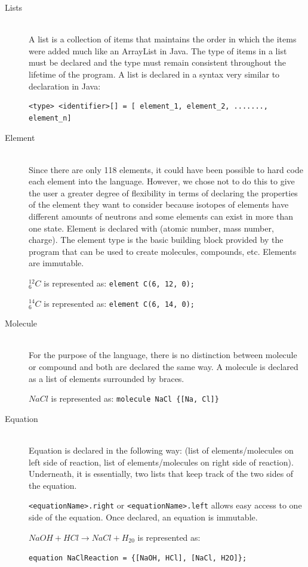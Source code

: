 \documentclass[11pt]{report}
\begin{document}
\begin{description}
\item[Lists] \hfill \\
A list is a collection of items that maintains the order in which the items were added much like an ArrayList in Java. The type of items in a list must be declared and the type must remain consistent throughout the lifetime of the program. A list is declared in a syntax very similar to declaration in Java:
\begin{verbatim}<type> <identifier>[] = [ element_1, element_2, ......., element_n]\end{verbatim}

\item[Element] \hfill \\
Since there are only 118 elements, it could have been possible to hard code each element into the language. However, we chose not to do this to give the user a greater degree of flexibility in terms of declaring the properties of the element they want to consider because isotopes of elements have different amounts of neutrons and some elements can exist in more than one state. Element is declared with (atomic number, mass number, charge). The element type is the basic building block provided by the program that can be used to create molecules, compounds, etc. Elements are immutable.

$_6^{12}C$ is represented as: \texttt{element C(6, 12, 0);}

$_6^{14}C$ is represented as: \texttt{element C(6, 14, 0);}

\item[Molecule] \hfill \\ For the purpose of the language, there is no distinction between molecule or compound and both are declared the same way. A molecule is declared as a list of elements surrounded by braces.

$NaCl$ is represented as: \texttt{molecule NaCl \{[Na, Cl]\}}

\item[Equation] \hfill \\
Equation is declared in the following way: (list of elements/molecules on left side of reaction, list of elements/molecules on right side of reaction). Underneath, it is essentially, two lists that keep track of the two sides of the equation.

\texttt{<equationName>.right} or \texttt{<equationName>.left} allows easy access to one side of the equation. Once declared, an equation is immutable.

$NaOH + HCl \rightarrow NaCl +H_20$ is represented as:

\texttt{equation NaClReaction = \{[NaOH, HCl], [NaCl, H2O]\};}

\end{description}
\end{document}
